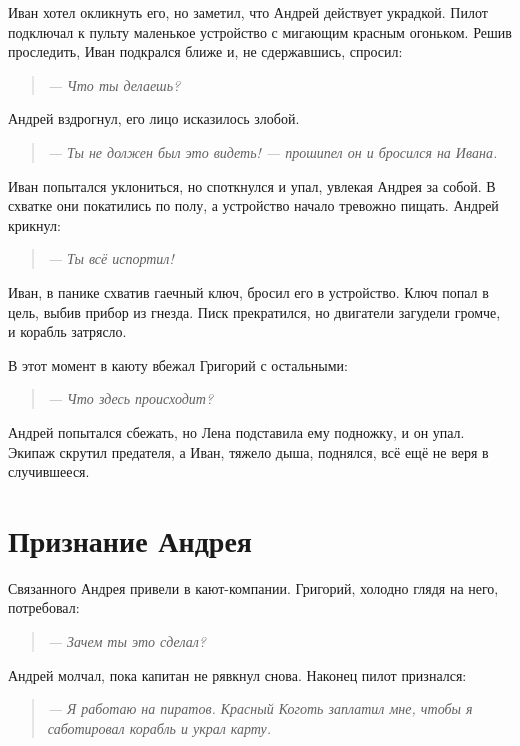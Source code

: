 \documentclass[12pt,a4paper]{book} %
\newenvironment{dialogue}{\begin{quote}\itshape}{\end{quote}}
\begin{document}
Иван хотел окликнуть его, но заметил, что Андрей действует украдкой. Пилот подключал к пульту маленькое устройство с мигающим красным огоньком. Решив проследить, Иван подкрался ближе и, не сдержавшись, спросил:

\begin{dialogue}
--- Что ты делаешь?
\end{dialogue}

Андрей вздрогнул, его лицо исказилось злобой.

\begin{dialogue}
--- Ты не должен был это видеть! --- прошипел он и бросился на Ивана.
\end{dialogue}

Иван попытался уклониться, но споткнулся и упал, увлекая Андрея за собой. В схватке они покатились по полу, а устройство начало тревожно пищать. Андрей крикнул:

\begin{dialogue}
--- Ты всё испортил!
\end{dialogue}

Иван, в панике схватив гаечный ключ, бросил его в устройство. Ключ попал в цель, выбив прибор из гнезда. Писк прекратился, но двигатели загудели громче, и корабль затрясло.

В этот момент в каюту вбежал Григорий с остальными:

\begin{dialogue}
--- Что здесь происходит?
\end{dialogue}

Андрей попытался сбежать, но Лена подставила ему подножку, и он упал. Экипаж скрутил предателя, а Иван, тяжело дыша, поднялся, всё ещё не веря в случившееся.

\section*{Признание Андрея}

Связанного Андрея привели в кают-компании. Григорий, холодно глядя на него, потребовал:

\begin{dialogue}
--- Зачем ты это сделал?
\end{dialogue}

Андрей молчал, пока капитан не рявкнул снова. Наконец пилот признался:

\begin{dialogue}
--- Я работаю на пиратов. Красный Коготь заплатил мне, чтобы я саботировал корабль и украл карту.
\end{dialogue}
\end{document}
